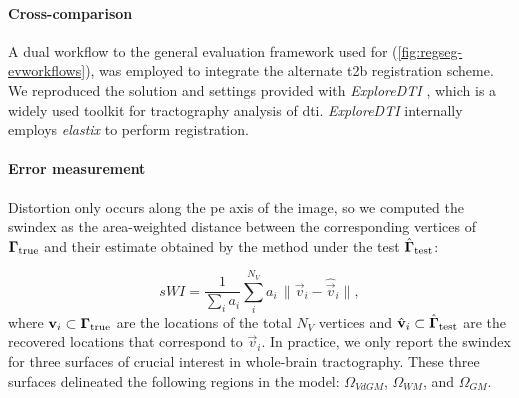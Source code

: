 \paragraph*{Cross-comparison} %
A dual workflow to the general evaluation framework used for \regseg{} (\autoref{fig:regseg-evworkflows}),
  was employed to integrate the alternate \gls*{t2b} registration scheme.
We reproduced the solution and settings provided with \emph{ExploreDTI}
  \citep{leemans_exploredti_2009}, which is a widely used toolkit for tractography analysis of
  \gls*{dti}.
\emph{ExploreDTI} internally employs \emph{elastix} \citep{klein_elastix_2010} to
  perform registration.

\paragraph*{Error measurement}\label{sec:regseg-experiments_evaluation}
Distortion only occurs along the \gls*{pe} axis of the image, so we computed the
  \gls*{swindex} as the area-weighted distance between the corresponding vertices of
  $\boldsymbol{\Gamma}_\text{true}$ and their estimate obtained by the method under the test $\hat{\boldsymbol{\Gamma}}_\text{test}$:

  \begin{equation}
  sWI = \frac{1}{\sum_i a_i} \sum\limits_i^{N_V} a_i\,\|
  \vec{v}_i - \hat{\vec{v}}_i \|,
  \label{eq:regseg-swindex}
  \end{equation}
  where $\mathbf{v}_i \subset \boldsymbol{\Gamma}_\text{true}$ are the locations of the total $N_V$ vertices
  and $\hat{\mathbf{v}}_i \subset \hat{\boldsymbol{\Gamma}}_\text{test}$ are the recovered locations
  that correspond to $\vec{v}_i$.
In practice, we only report the \gls*{swindex} for three surfaces of crucial interest in whole-brain
  tractography.
These three surfaces delineated the following regions in the model: $\Omega_{VdGM}$, $\Omega_{WM}$, and $\Omega_{GM}$.